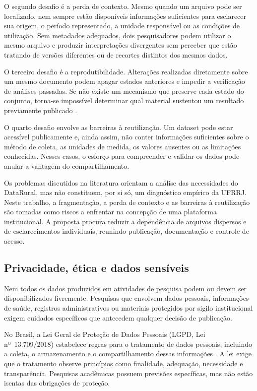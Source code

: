 O segundo desafio é a perda de contexto. Mesmo quando um arquivo pode ser localizado, nem sempre estão disponíveis informações suficientes para esclarecer sua origem, o período representado, a unidade responsável ou as condições de utilização. Sem metadados adequados, dois pesquisadores podem utilizar o mesmo arquivo e produzir interpretações divergentes sem perceber que estão tratando de versões diferentes ou de recortes distintos dos mesmos dados.

O terceiro desafio é a reprodutibilidade. Alterações realizadas diretamente sobre um mesmo documento podem apagar estados anteriores e impedir a verificação de análises passadas. Se não existe um mecanismo que preserve cada estado do conjunto, torna-se impossível determinar qual material sustentou um resultado previamente publicado \cite{klump2021versioning}.

O quarto desafio envolve as barreiras à reutilização. Um dataset pode estar acessível publicamente e, ainda assim, não conter informações suficientes sobre o método de coleta, as unidades de medida, os valores ausentes ou as limitações conhecidas. Nesses casos, o esforço para compreender e validar os dados pode anular a vantagem do compartilhamento.

Os problemas discutidos na literatura orientam a análise das necessidades do DataRural, mas não constituem, por si só, um diagnóstico empírico da UFRRJ. Neste trabalho, a fragmentação, a perda de contexto e as barreiras à reutilização são tomadas como riscos a enfrentar na concepção de uma plataforma institucional. A proposta procura reduzir a dependência de arquivos dispersos e de esclarecimentos individuais, reunindo publicação, documentação e controle de acesso.

\subsection{Privacidade, ética e dados sensíveis}

Nem todos os dados produzidos em atividades de pesquisa podem ou devem ser disponibilizados livremente. Pesquisas que envolvem dados pessoais, informações de saúde, registros administrativos ou materiais protegidos por sigilo institucional exigem cuidados específicos que antecedem qualquer decisão de publicação.

No Brasil, a Lei Geral de Proteção de Dados Pessoais (LGPD, Lei nº~13.709/2018) estabelece regras para o tratamento de dados pessoais, incluindo a coleta, o armazenamento e o compartilhamento dessas informações \cite{brasil2018lgpd}. A lei exige que o tratamento observe princípios como finalidade, adequação, necessidade e transparência. Pesquisas acadêmicas possuem previsões específicas, mas não estão isentas das obrigações de proteção.

